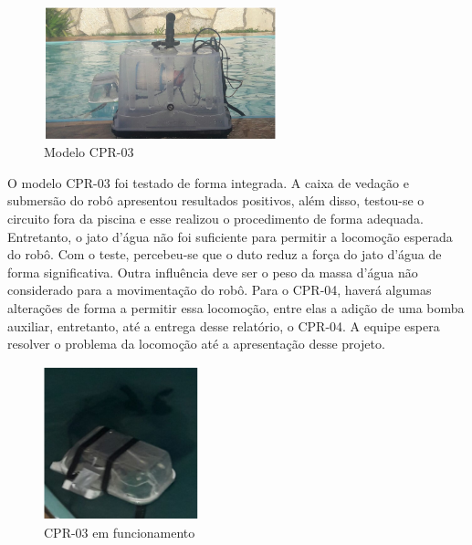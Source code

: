 \begin{figure}[h]
  \centering
  \includegraphics[width=0.6\textwidth]{figuras/cpr-03.png}
  \caption{Modelo CPR-03}
  \label{fig:cpr-03}
\end{figure}
\FloatBarrier

O modelo CPR-03 foi testado de forma integrada. A caixa de vedação e submersão do robô apresentou resultados positivos, além disso, testou-se o circuito fora da piscina e esse realizou o procedimento de forma adequada. Entretanto, o jato d’água não foi suficiente para permitir a locomoção esperada do robô. Com o teste, percebeu-se que o duto reduz a força do jato d’água de forma significativa.  Outra influência deve ser o peso da massa d’água não considerado para a movimentação do robô. Para o CPR-04, haverá algumas alterações de forma a permitir essa locomoção, entre elas a adição de uma bomba auxiliar, entretanto, até a entrega desse relatório, o CPR-04. A equipe espera resolver o problema da locomoção até a apresentação desse projeto.

\begin{figure}[h]
  \centering
  \includegraphics[width=0.4\textwidth]{figuras/cpr-04.png}
  \caption{CPR-03 em funcionamento}
  \label{fig:cpr-04}
\end{figure}
\FloatBarrier